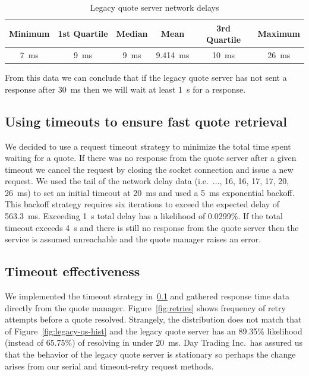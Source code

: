 \begin{table}[htpb]
  \centering
  \caption{Legacy quote server network delays}
  \label{tbl:qs-net-delay}
  \begin{tabular}{@{}cccccc@{}}
    \toprule
    Minimum & 1st Quartile & Median & Mean & 3rd Quartile & Maximum \\ 
    \midrule
    \SI{7}{\milli\second} & \SI{9}{\milli\second} & \SI{9}{\milli\second} & \SI{9.414}{\milli\second} & \SI{10}{\milli\second} & \SI{26}{\milli\second} \\ 
    \bottomrule
  \end{tabular}
\end{table}

From this data we can conclude that if the legacy quote server has not sent a response after \SI{30}{\milli\second} then we will wait at least \SI{1}{\second} for a response.

\subsection{Using timeouts to ensure fast quote retrieval}\label{sec:qs-timeout}
We decided to use a request timeout strategy to minimize the total time spent waiting for a quote.
If there was no response from the quote server after a given timeout we cancel the request by closing the socket connection and issue a new request.
We used the tail of the network delay data (i.e.\ ..., 16, 16, 17, 17, 20, \SI{26}{\milli\second}) to set an initial timeout at \SI{20}{\milli\second} and used a \SI{5}{\milli\second} exponential backoff.
This backoff strategy requires six iterations to exceed the expected delay of \SI{563.3}{\milli\second}.
Exceeding \SI{1}{\second} total delay has a likelihood of 0.0299\%.
If the total timeout exceeds \SI{4}{\second} and there is still no response from the quote server then the service is assumed unreachable and the quote manager raises an error.

\subsection{Timeout effectiveness}\label{sec:timeout-effectiveness}
We implemented the timeout strategy in~\ref{sec:qs-timeout} and gathered response time data directly from the quote manager.
Figure~\ref{fig:retries} shows frequency of retry attempts before a quote resolved.
Strangely, the distribution does not match that of Figure~\ref{fig:legacy-qs-hist} and the legacy quote server has an 89.35\% likelihood (instead of 65.75\%) of resolving in under \SI{20}{\milli\second}.
Day Trading Inc.\ has assured us that the behavior of the legacy quote server is stationary so perhaps the change arises from our serial and timeout-retry request methods.

